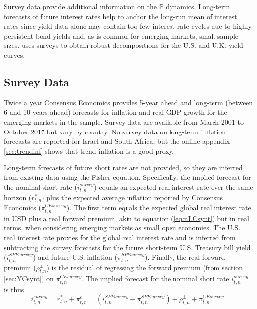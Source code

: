 \documentclass[a4paper, 12pt]{article}
\providecommand{\tnr}{n}
\providecommand{\idxt}{t}
\providecommand{\idxs}{\idxt,\tnr}
\providecommand{\srate}{i}
\providecommand{\realrate}{r_{\idxs}}
\providecommand{\rateSvy}{\srate_{\idxs}^{survey}}
\providecommand{\Pmeasure}{\mathbb{P}}
\providecommand{\fwdprm}{\rho_{\idxs}}
\newcommand{\eqrrt}{\rateSvy = \realrate^{*} + \pi^{e}_{\idxs} = \left( \srate^{SPF survey}_{\idxs} - \pi^{SPF survey}_{\idxs} \right) + \fwdprm^{\perp} + \pi^{CE survey}_{\idxs} }
\begin{document}
Survey data provide additional information on the \(\Pmeasure\) dynamics. Long-term forecasts of future interest rates help to anchor the long-run mean of interest rates since yield data alone may contain too few interest rate cycles due to highly persistent bond yields and, as is common for emerging markets, small sample sizes. \cite{Guimaraes:2014} uses surveys to obtain robust decompositions for the U.S. and U.K. yield curves. 

\subsection{Survey Data} \label{sec:SurveyData}
Twice a year Consensus Economics provides 5-year ahead and long-term (between 6 and 10 years ahead) forecasts for inflation and real GDP growth for the emerging markets in the sample. Survey data are available from March 2001 to October 2017 but vary by country. No survey data on long-term inflation forecasts are reported for Israel and South Africa, but the online appendix \ref{sec:trendinf} shows that trend inflation is a good proxy. 

Long-term forecasts of future short rates are not provided, so they are inferred from existing data using the Fisher equation. Specifically, the implied forecast for the nominal short rate (\(\rateSvy\)) equals an expected real interest rate over the same horizon (\(\realrate^{*}\)) plus the expected average inflation reported by Consensus Economics (\(\pi^{CE survey}_{\idxs}\)). The first term equals the expected global real interest rate in USD plus a real forward premium, akin to equation (\ref{eq:nLCsynt}) but in real terms, when considering emerging markets as small open economies. The U.S. real interest rate proxies for the global real interest rate and is inferred from subtracting the survey forecasts for the future short-term U.S. Treasury bill yield (\(\srate^{SPF survey}_{\idxs}\)) and future U.S. inflation (\(\pi^{SPF survey}_{\idxs}\)). Finally, the real forward premium (\(\fwdprm^{\perp}\)) is the residual of regressing the forward premium (from section \ref{sec:YCsynt}) on \(\pi^{CE survey}_{\idxs}\). The implied forecast for the nominal short rate \(\rateSvy\) is thus
\begin{equation} \label{eq:nRrt}
\eqrrt .
\end{equation}
\end{document}
